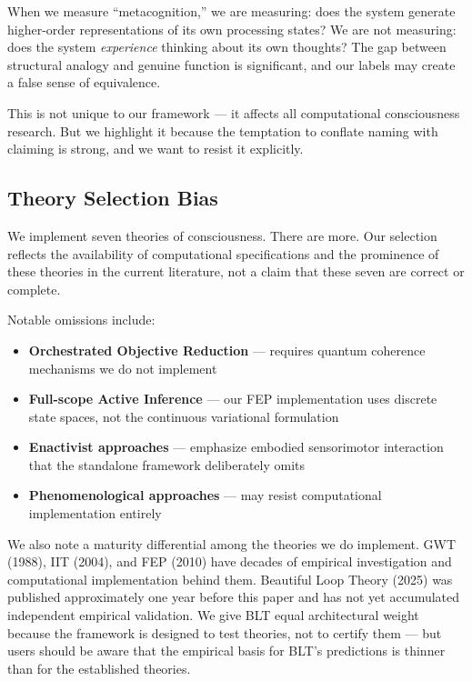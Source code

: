 When we measure ``metacognition,'' we are measuring: does the system generate higher-order representations of its own processing states? We are not measuring: does the system \textit{experience} thinking about its own thoughts? The gap between structural analogy and genuine function is significant, and our labels may create a false sense of equivalence.

This is not unique to our framework --- it affects all computational consciousness research. But we highlight it because the temptation to conflate naming with claiming is strong, and we want to resist it explicitly.

\subsection{Theory Selection Bias}

We implement seven theories of consciousness. There are more. Our selection reflects the availability of computational specifications and the prominence of these theories in the current literature, not a claim that these seven are correct or complete.

Notable omissions include:

\begin{itemize}
    \item \textbf{Orchestrated Objective Reduction} \cite{hameroff2014} --- requires quantum coherence mechanisms we do not implement
    \item \textbf{Full-scope Active Inference} --- our FEP implementation uses discrete state spaces, not the continuous variational formulation
    \item \textbf{Enactivist approaches} \cite{thompson2007, varela1991} --- emphasize embodied sensorimotor interaction that the standalone framework deliberately omits
    \item \textbf{Phenomenological approaches} --- may resist computational implementation entirely
\end{itemize}

We also note a maturity differential among the theories we do implement. GWT (1988), IIT (2004), and FEP (2010) have decades of empirical investigation and computational implementation behind them. Beautiful Loop Theory (2025) was published approximately one year before this paper and has not yet accumulated independent empirical validation. We give BLT equal architectural weight because the framework is designed to test theories, not to certify them --- but users should be aware that the empirical basis for BLT's predictions is thinner than for the established theories.

